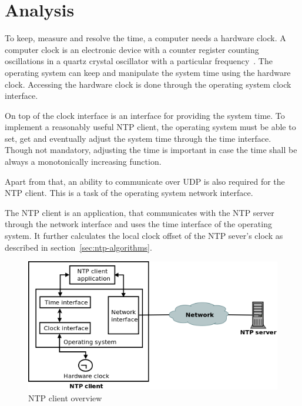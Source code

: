 
\chapter{Analysis}
To keep, measure and resolve the time, a computer needs a hardware clock.
A computer clock is an electronic device with a counter register counting oscillations in a
quartz crystal oscillator with a particular frequency~\cite{thesis-sync}.
The operating system can keep and manipulate the system time using the hardware clock.
Accessing the hardware clock is done through the operating system clock interface.

On top of the clock interface is an interface for providing the system time.
To implement a reasonably useful NTP client,
the operating system must be able to set, get and eventually adjust the system time
through the time interface.
Though not mandatory, adjusting the time is important
in case the time shall be always a monotonically increasing function.

Apart from that, an ability to communicate over UDP is also required for the NTP client.
This is a task of the operating system network interface.

The NTP client is an application, that communicates with the NTP server through the network interface
and uses the time interface of the operating system.
It further calculates the local clock offset of the NTP sever's clock
as described in section~\ref{sec:ntp-algorithms}.

\begin{figure}
  \centering
  \includegraphics[width=13cm,keepaspectratio]{fig/analysis.png}
  \caption{NTP client overview}
  \label{fig:analysis-overview}
\end{figure}

